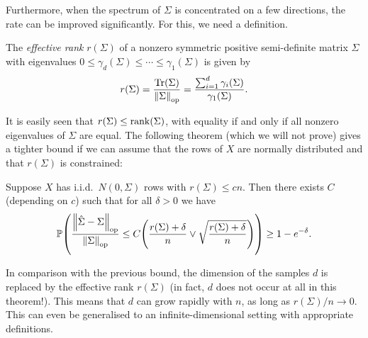 Furthermore, when the spectrum of $\Sigma$ is concentrated on a few directions, the rate can be improved significantly. For this, we need a definition.
\begin{definition}
	The \emph{effective rank} $r(\Sigma)$ of a nonzero symmetric positive semi-definite matrix $\Sigma$ with eigenvalues $0 \leq \gamma_d(\Sigma) \leq \dotsb \leq \gamma_1(\Sigma)$ is given by
	\[
	r(\Sigma) = \frac{\Tr(\Sigma)}{\norm{\Sigma}_\mathrm{op}} = \frac{\sum_{i=1}^d \gamma_i(\Sigma)}{\gamma_1(\Sigma)}. 
	\]
\end{definition}
It is easily seen that $r(\Sigma) \leq \mathrm{rank}(\Sigma)$, with equality if and only if all nonzero eigenvalues of $\Sigma$ are equal. The following theorem (which we will not prove) gives a tighter bound if we can assume that the rows of $X$ are normally distributed and that $r(\Sigma)$ is constrained:
\begin{theorem}
	Suppose $X$ has i.i.d.\ $N(0, \Sigma)$ rows with $r(\Sigma) \leq cn$. Then there exists $C$ (depending on $c$) such that for all $\delta > 0$ we have
	\[
	\mathbb P\qty(\frac{\norm{\hat\Sigma - \Sigma}_\mathrm{op}}{\norm{\Sigma}_\mathrm{op}} \leq C \qty(\frac{r(\Sigma) + \delta}{n} \lor \sqrt{\frac{r(\Sigma) + \delta}{n}})) \geq 1 - e^{-\delta}. 
	\]
\end{theorem}

In comparison with the previous bound, the dimension of the samples $d$ is replaced by the effective rank $r(\Sigma)$ (in fact, $d$ does not occur at all in this theorem!). This means that $d$ can grow rapidly with $n$, as long as $r(\Sigma)/n \to 0$. This can even be generalised to an infinite-dimensional setting with appropriate definitions. 